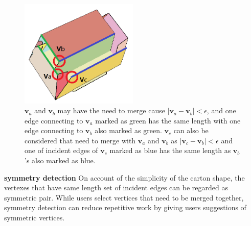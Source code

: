 \begin{figure}
	\centering
	\includegraphics[width=0.5\textwidth]{images/vertexMerging.png}
	\caption{$\mathbf{v}_a$ and $\mathbf{v}_b$ may have the need to merge cause $|\mathbf{v}_a-\mathbf{v}_b|<\epsilon$, and one edge connecting to $\mathbf{v}_a$ marked as green has the same length with one edge connecting to $\mathbf{v}_b$ also marked as green. $\mathbf{v}_c$ can also be considered that need to merge with $\mathbf{v}_a$ and $\mathbf{v}_b$ as $|\mathbf{v}_c-\mathbf{v}_b|<\epsilon$ and one of incident edges of $\mathbf{v}_c$ marked as blue has the same length as $\mathbf{v}_b$'s also marked as blue. }
	\label{fig:vertexMerging}
\end{figure}


\noindent
\textbf{symmetry detection} On account of the simplicity of the carton shape, the vertexes that have same length set of incident edges can be regarded as symmetric pair. While users select vertices that need to be merged together, symmetry detection can reduce repetitive work by giving users suggestions of symmetric vertices.

{}


